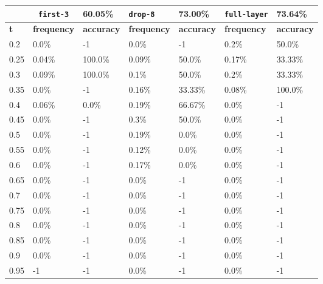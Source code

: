 
\begin{table}[t]
\centering
\begin{tabular}{lllllll} %
\hline

\multicolumn{1}{c}{}& 
\multicolumn{1}{c}{\texttt{first-3}} & \multicolumn{1}{l|}{60.05\%} 
& \multicolumn{1}{l}{\texttt{drop-8}} & \multicolumn{1}{l|}{73.00\%}
& \multicolumn{1}{l}{\texttt{full-layer}} & 73.64\%
\\ \hline
\multicolumn{1}{l|}{\textbf{t}} &
\multicolumn{1}{l|}{\textbf{frequency}} & 
\multicolumn{1}{l|}{\textbf{accuracy}} & 
\multicolumn{1}{l|}{\textbf{frequency}} & 
\multicolumn{1}{l|}{\textbf{accuracy}} & 
\multicolumn{1}{l|}{\textbf{frequency}} & 
\multicolumn{1}{l|}{\textbf{accuracy}} \\ \hline
	\multicolumn{1}{l|}{0.2}&  0.0\% & \multicolumn{1}{l|}{-1}& 0.0\% & \multicolumn{1}{l|}{-1}& 0.2\% & 50.0\%\\ 
\multicolumn{1}{l|}{0.25}&  0.04\% & \multicolumn{1}{l|}{100.0\%}& 0.09\% & \multicolumn{1}{l|}{50.0\%}& 0.17\% & 33.33\%\\ 
\multicolumn{1}{l|}{0.3}&  0.09\% & \multicolumn{1}{l|}{100.0\%}& 0.1\% & \multicolumn{1}{l|}{50.0\%}& 0.2\% & 33.33\%\\ 
\multicolumn{1}{l|}{0.35}&  0.0\% & \multicolumn{1}{l|}{-1}& 0.16\% & \multicolumn{1}{l|}{33.33\%}& 0.08\% & 100.0\%\\ 
\multicolumn{1}{l|}{0.4}&  0.06\% & \multicolumn{1}{l|}{0.0\%}& 0.19\% & \multicolumn{1}{l|}{66.67\%}& 0.0\% & -1\\ 
\multicolumn{1}{l|}{0.45}&  0.0\% & \multicolumn{1}{l|}{-1}& 0.3\% & \multicolumn{1}{l|}{50.0\%}& 0.0\% & -1\\ 
\multicolumn{1}{l|}{0.5}&  0.0\% & \multicolumn{1}{l|}{-1}& 0.19\% & \multicolumn{1}{l|}{0.0\%}& 0.0\% & -1\\ 
\multicolumn{1}{l|}{0.55}&  0.0\% & \multicolumn{1}{l|}{-1}& 0.12\% & \multicolumn{1}{l|}{0.0\%}& 0.0\% & -1\\ 
\multicolumn{1}{l|}{0.6}&  0.0\% & \multicolumn{1}{l|}{-1}& 0.17\% & \multicolumn{1}{l|}{0.0\%}& 0.0\% & -1\\ 
\multicolumn{1}{l|}{0.65}&  0.0\% & \multicolumn{1}{l|}{-1}& 0.0\% & \multicolumn{1}{l|}{-1}& 0.0\% & -1\\ 
\multicolumn{1}{l|}{0.7}&  0.0\% & \multicolumn{1}{l|}{-1}& 0.0\% & \multicolumn{1}{l|}{-1}& 0.0\% & -1\\ 
\multicolumn{1}{l|}{0.75}&  0.0\% & \multicolumn{1}{l|}{-1}& 0.0\% & \multicolumn{1}{l|}{-1}& 0.0\% & -1\\ 
\multicolumn{1}{l|}{0.8}&  0.0\% & \multicolumn{1}{l|}{-1}& 0.0\% & \multicolumn{1}{l|}{-1}& 0.0\% & -1\\ 
\multicolumn{1}{l|}{0.85}&  0.0\% & \multicolumn{1}{l|}{-1}& 0.0\% & \multicolumn{1}{l|}{-1}& 0.0\% & -1\\ 
\multicolumn{1}{l|}{0.9}&  0.0\% & \multicolumn{1}{l|}{-1}& 0.0\% & \multicolumn{1}{l|}{-1}& 0.0\% & -1\\ 
\multicolumn{1}{l|}{0.95}&  -1 & \multicolumn{1}{l|}{-1}& 0.0\% & \multicolumn{1}{l|}{-1}& 0.0\% & -1\\ 


\end{tabular}
\end{table}
